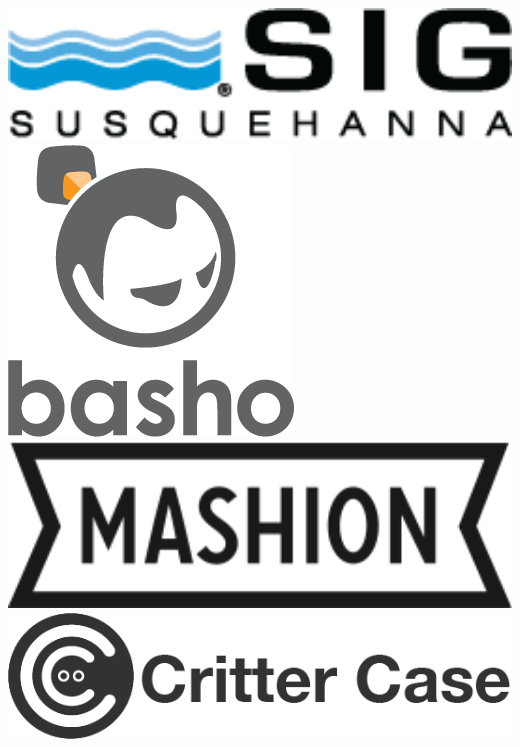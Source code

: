 \documentclass[xcolor=dvipsnames,red]{beamer}
\begin{document}
\begin{frame}
\begin{columns}
\begin{column}{.33\textwidth}
\includegraphics[width=1\textwidth]{imgs/sig.png}\\
\vspace{.5 cm}
\includegraphics[width=.75\textwidth]{imgs/basho.png}\\
\vspace{.5 cm}
\includegraphics[width=1\textwidth]{imgs/mashion.png}\\
\vspace{.5 cm}
\includegraphics[width=1\textwidth]{imgs/critter_case.png}
\end{column}
\end{columns}
\end{frame}
\end{document}
